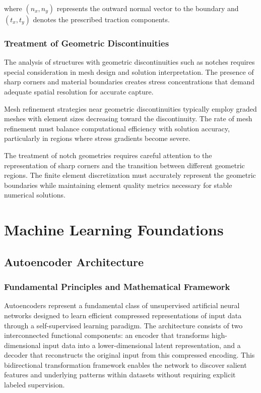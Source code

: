 \documentclass[12pt,a4paper]{report}
\begin{document}
where $(n_x, n_y)$ represents the outward normal vector to the boundary and $(t_x, t_y)$ denotes the prescribed traction components.



\subsubsection{Treatment of Geometric Discontinuities}

The analysis of structures with geometric discontinuities such as notches requires special consideration in mesh design and solution interpretation. The presence of sharp corners and material boundaries creates stress concentrations that demand adequate spatial resolution for accurate capture.

Mesh refinement strategies near geometric discontinuities typically employ graded meshes with element sizes decreasing toward the discontinuity. The rate of mesh refinement must balance computational efficiency with solution accuracy, particularly in regions where stress gradients become severe.

The treatment of notch geometries requires careful attention to the representation of sharp corners and the transition between different geometric regions. The finite element discretization must accurately represent the geometric boundaries while maintaining element quality metrics necessary for stable numerical solutions.


\section{Machine Learning Foundations}
\label{sec:ml_foundations}

\subsection{Autoencoder Architecture}

\subsubsection*{Fundamental Principles and Mathematical Framework}

Autoencoders represent a fundamental class of unsupervised artificial neural networks designed to learn efficient compressed representations of input data through a self-supervised learning paradigm. The architecture consists of two interconnected functional components: an encoder that transforms high-dimensional input data into a lower-dimensional latent representation, and a decoder that reconstructs the original input from this compressed encoding. This bidirectional transformation framework enables the network to discover salient features and underlying patterns within datasets without requiring explicit labeled supervision.
\end{document}
